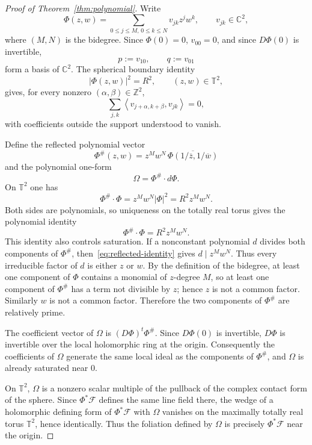 \documentclass[11pt,reqno]{article}
\theoremstyle{remark}
\newcommand{\C}{\mathbb C}
\newcommand{\F}{\mathcal F}
\newcommand{\T}{\mathbb T}
\newcommand{\ol}{\overline}
\newcommand{\ip}[2]{\left\langle #1,#2\right\rangle}
\begin{document}
\begin{proof}[Proof of Theorem~\ref{thm:polynomial}]
Write
\[
 \Phi(z,w)=\sum_{0\le j\le M,\,0\le k\le N}v_{jk}z^jw^k,
 \qquad v_{jk}\in\C^2,
\]
where $(M,N)$ is the bidegree. Since $\Phi(0)=0$, $v_{00}=0$, and since $D\Phi(0)$ is invertible,
\[
 p:=v_{10},\qquad q:=v_{01}
\]
form a basis of $\C^2$. The spherical boundary identity
\begin{equation}\label{eq:sphere}
 |\Phi(z,w)|^2=R^2,\qquad (z,w)\in\T^2,
\end{equation}
gives, for every nonzero $(\alpha,\beta)\in\mathbb Z^2$,
\begin{equation}\label{eq:fourier}
 \sum_{j,k}\ip{v_{j+\alpha,k+\beta}}{v_{jk}}=0,
\end{equation}
with coefficients outside the support understood to vanish.

Define the reflected polynomial vector
\[
 \Phi^{\#}(z,w)=z^Mw^N\,\ol{\Phi(1/\ol z,1/\ol w)}
\]
and the polynomial one-form
\[
 \Omega=\Phi^{\#}\cdot d\Phi.
\]
On $\T^2$ one has
\[
 \Phi^{\#}\cdot\Phi=z^Mw^N|\Phi|^2=R^2z^Mw^N.
\]
Both sides are polynomials, so uniqueness on the totally real torus gives the polynomial identity
\begin{equation}\label{eq:reflected-identity}
 \Phi^{\#}\cdot\Phi=R^2z^Mw^N.
\end{equation}
This identity also controls saturation. If a nonconstant polynomial $d$ divides both components of $\Phi^{\#}$, then~\eqref{eq:reflected-identity} gives $d\mid z^Mw^N$. Thus every irreducible factor of $d$ is either $z$ or $w$. By the definition of the bidegree, at least one component of $\Phi$ contains a monomial of $z$-degree $M$, so at least one component of $\Phi^{\#}$ has a term not divisible by $z$; hence $z$ is not a common factor. Similarly $w$ is not a common factor. Therefore the two components of $\Phi^{\#}$ are relatively prime.

The coefficient vector of $\Omega$ is $(D\Phi)^t\Phi^{\#}$. Since $D\Phi(0)$ is invertible, $D\Phi$ is invertible over the local holomorphic ring at the origin. Consequently the coefficients of $\Omega$ generate the same local ideal as the components of $\Phi^{\#}$, and $\Omega$ is already saturated near $0$.

On $\T^2$, $\Omega$ is a nonzero scalar multiple of the pullback of the complex contact form of the sphere. Since $\Phi^*\F$ defines the same line field there, the wedge of a holomorphic defining form of $\Phi^*\F$ with $\Omega$ vanishes on the maximally totally real torus $\T^2$, hence identically. Thus the foliation defined by $\Omega$ is precisely $\Phi^*\F$ near the origin.


\end{proof}
\end{document}
